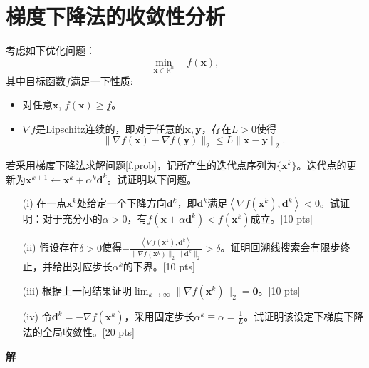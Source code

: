 \documentclass[10pt]{article}
\begin{document}
\section{梯度下降法的收敛性分析}
考虑如下优化问题：
\begin{equation}\label{f.prob}
	\min_{\bm{x}\in \mathbb{R}^n} \quad f(\bm{x}),
\end{equation}
其中目标函数$f$满足一下性质:
\begin{itemize}
	\item 对任意$\bm{x}$, $f(\bm{x})\ge \underline{f}$。
	\item $\nabla f$是Lipschitz连续的，即对于任意的$\bm{x}, \bm{y}$，存在$L>0$使得
	$$
	\|\nabla f(\bm{x}) - \nabla f(\bm{y})\|_2 \le L \|\bm{x}- \bm{y}\|_2.
	$$	
\end{itemize}
若采用梯度下降法求解问题\eqref{f.prob}，记所产生的迭代点序列为$\{\bm{x}^k\}$。迭代点的更新为$\bm{x}^{k+1} \leftarrow \bm{x}^k + \alpha^k\bm{d}^k$。试证明以下问题。
\begin{enumerate}
	\item[(i)] 在一点$\bm{x}^k$处给定一个下降方向$\bm{d}^k$，即$\bm{d}^k$满足$\left \langle \nabla f(\bm{x}^k), \bm{d}^k \right \rangle <0$。试证明：对于充分小的$\alpha>0$，有$f(\bm{x}+\alpha\bm{d}^k)<f(\bm{x}^k)$成立。{\color{red}[10 pts]}
	\item[(ii)] 假设存在$\delta>0$使得$-\frac{\left \langle \nabla f(\bm{x}^k), \bm{d}^k \right \rangle}{\|\nabla f(\bm{x}^k)\|_2\|\bm{d}^k\|_2}>\delta$。证明回溯线搜索会有限步终止，并给出对应步长$\alpha^k$的下界。{\color{red}[10 pts]}
	\item[(iii)] 根据上一问结果证明$\lim_{k\to\infty}\|\nabla f(\bm{x}^k)\|_2= \bm{0}$。{\color{red}[10 pts]}
	\item[(iv)] 令$\bm{d}^k=-\nabla f(\bm{x}^k)$，采用固定步长$\alpha^k\equiv \alpha = \frac{1}{L}$。试证明该设定下梯度下降法的全局收敛性。{\color{red}[20 pts]}
\end{enumerate}
\textbf{解}
\end{document}
